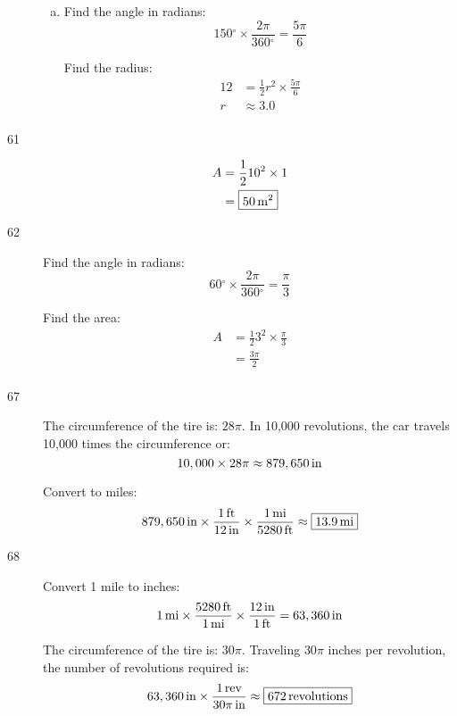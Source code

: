 \documentclass{exam}
\newcommand{\degree}{\ensuremath{^\circ}}
\begin{document}
\begin{description}
\begin{enumerate}[(a)]
          \item 
            Find the angle in radians:
            \[
              150 \degree \times \frac{2 \pi}{360 \degree} = \frac{5 \pi}{6}
            \]

            Find the radius:
            \begin{align*}
              12 & = \frac{1}{2} r^2 \times \frac{5 \pi}{6} \\
              r  & \approx \boxed{ 3.0 } \\
            \end{align*}

        \end{enumerate}

      \item[61]
        \begin{align*}
          A & = \frac{1}{2} 10^2 \times 1 \\
            & = \boxed{ \unit[50]{m^2} } \\
        \end{align*}

      \item[62]
        Find the angle in radians:
        \[
          60 \degree \times \frac{2 \pi}{360 \degree} = \frac{\pi}{3}
        \]

        Find the area:
        \begin{align*}
          A & = \frac{1}{2} 3^2 \times \frac{\pi}{3} \\
            & = \boxed{ \frac{3 \pi}{2} } \\
        \end{align*}

      \item[67]
        The circumference of the tire is: $28 \pi$.  In 10,000 revolutions, the
        car travels 10,000 times the circumference or:
        \[
          10,000 \times 28 \pi \approx \unit[ 879,650 ]{in}
        \]

        Convert to miles:
        \[
          \unit[ 879,650 ]{in} \times \frac{ \unit[1]{ft} }{ \unit[12]{in}} \times \frac{ \unit[1]{mi} }{ \unit[5280]{ft} } \approx \boxed{ \unit[13.9]{mi} }
        \]

      \item[68]
        Convert 1 mile to inches:
        \[
          \unit[ 1 ]{mi} \times \frac{ \unit[5280]{ft} }{ \unit[1]{mi}} \times \frac{ \unit[12]{in} }{ \unit[1]{ft} } = \unit[63,360]{in}
        \]

        The circumference of the tire is: $30 \pi$.  Traveling $30 \pi$ inches per revolution, the number of revolutions required is:
        \[
          \unit[63,360]{in} \times \frac{\unit[1]{rev}}{\unit[30 \pi]{in}} \approx \boxed{ \unit[672]{revolutions} }
        \]


\end{description}
\end{document}
